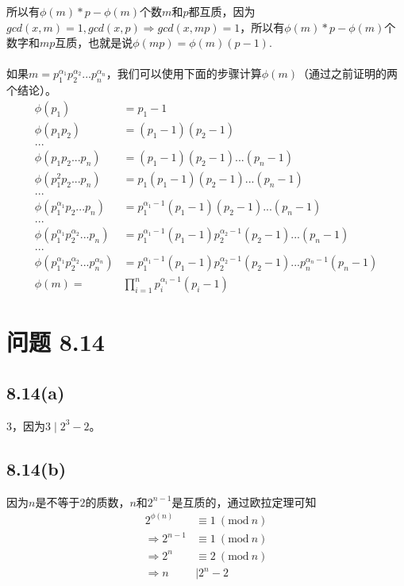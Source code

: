 \documentclass[acmlarge,screen]{acmart}
\begin{document}
所以有$\phi(m)*p-\phi(m)$个数$m$和$p$都互质，因为$gcd(x, m)=1, gcd(x, p) \Rightarrow gcd(x, mp)=1$，所以有$\phi(m)*p-\phi(m)$个数字和$mp$互质，也就是说$\phi(mp)=\phi(m)(p-1)$.\\\\
如果$m=p_1^{\alpha_1}p_2^{\alpha_2}...p_n^{\alpha_n}$，我们可以使用下面的步骤计算$\phi(m)$（通过之前证明的两个结论）。
\begin{align*}
	\phi(p_1)&=p_1-1\\
	\phi(p_1p_2)&=(p_1-1)(p_2-1)\\
	...\\
	\phi(p_1p_2...p_n)&=(p_1-1)(p_2-1)...(p_n-1)\\
	\phi(p_1^2p_2...p_n)&=p_1(p_1-1)(p_2-1)...(p_n-1)\\
	...\\
	\phi(p_1^{\alpha_1}p_2...p_n)&=p_1^{\alpha_1-1}(p_1-1)(p_2-1)...(p_n-1)\\
	...\\
	\phi(p_1^{\alpha_1}p_2^{\alpha_2}...p_n)&=p_1^{\alpha_1-1}(p_1-1)p_2^{\alpha_2-1}(p_2-1)...(p_n-1)\\
	...\\
	\phi(p_1^{\alpha_1}p_2^{\alpha_2}...p_n^{\alpha_n})&=p_1^{\alpha_1-1}(p_1-1)p_2^{\alpha_2-1}(p_2-1)...p_n^{\alpha_n-1}(p_n-1)\\
	\phi(m)=&\prod_{i=1}^{n}p_i^{\alpha_i-1}(p_i-1) 
\end{align*}
\section{问题 8.14}
\subsection{8.14(a)}
$3$，因为$3\mid 2^3-2$。
\subsection{8.14(b)}
因为$n$是不等于$2$的质数，$n$和$2^{n - 1}$是互质的，通过欧拉定理可知
\begin{align*}
	2^{\phi(n)}&\equiv1\ (\text{mod}\ n)\\
	\Rightarrow 2^{n-1}&\equiv1\ (\text{mod}\ n)\\
	\Rightarrow 2^n&\equiv2\ (\text{mod}\ n)\\
	\Rightarrow n&\mid 2^n-2
\end{align*}
\end{document}
